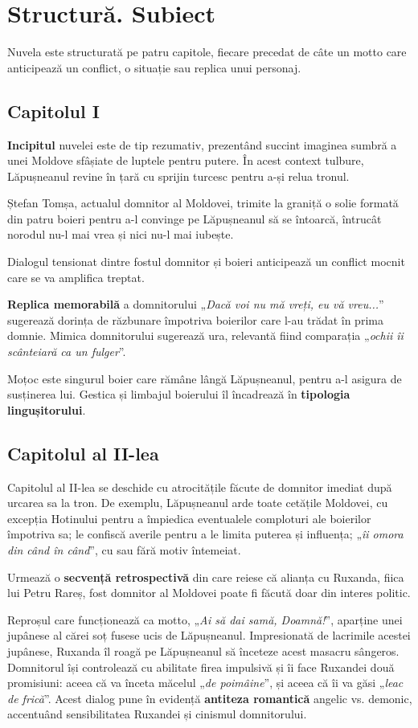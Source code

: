 \documentclass{article}
\newcommand{\qu}[1]{„\emph{#1}”}
\begin{document}
\section{Structură. Subiect}
Nuvela este structurată pe patru capitole, fiecare precedat de câte un motto care anticipează un conflict, o situație sau replica unui personaj.
\subsection{Capitolul I}
\textbf{Incipitul} nuvelei este de tip rezumativ, prezentând succint imaginea sumbră a unei Moldove sfâșiate de luptele pentru putere. În acest context tulbure, Lăpușneanul revine în țară cu sprijin turcesc pentru a-și relua tronul.

Ștefan Tomșa, actualul domnitor al Moldovei, trimite la graniță o solie formată din patru boieri pentru a-l convinge pe Lăpușneanul să se întoarcă, întrucât norodul nu-l mai vrea și nici nu-l mai iubește.

Dialogul tensionat dintre fostul domnitor și boieri anticipează un conflict mocnit care se va amplifica treptat.

\textbf{Replica memorabilă} a domnitorului \qu{Dacă voi nu mă vreți, eu vă vreu...} sugerează dorința de răzbunare împotriva boierilor care l-au trădat în prima domnie. Mimica domnitorului sugerează ura, relevantă fiind comparația \qu{ochii îi scânteiară ca un fulger}.

Moțoc este singurul boier care rămâne lângă Lăpușneanul, pentru a-l asigura de susținerea lui. Gestica și limbajul boierului îl încadrează în \textbf{tipologia lingușitorului}.

\subsection{Capitolul al II-lea}
Capitolul al II-lea se deschide cu atrocitățile făcute de domnitor imediat după urcarea sa la tron. De exemplu, Lăpușneanul arde toate cetățile Moldovei, cu excepția Hotinului pentru a împiedica eventualele comploturi ale boierilor împotriva sa; le confiscă averile pentru a le limita puterea și influența; \qu{îi omora din când în când}, cu sau fără motiv întemeiat.

Urmează o \textbf{secvență retrospectivă} din care reiese că alianța cu Ruxanda, fiica lui Petru Rareș, fost domnitor al Moldovei poate fi făcută doar din interes politic.

Reproșul care funcționează ca motto, \qu{Ai să dai samă, Doamnă!}, aparține unei jupânese al cărei soț fusese ucis de Lăpușneanul. Impresionată de lacrimile acestei jupânese, Ruxanda îl roagă pe Lăpușneanul să înceteze acest masacru sângeros. Domnitorul își controlează cu abilitate firea impulsivă și îi face Ruxandei două promisiuni: aceea că va înceta măcelul \qu{de poimâine}, și aceea că îi va găsi \qu{leac de frică}. Acest dialog pune în evidență \textbf{antiteza romantică} angelic vs. demonic, accentuând sensibilitatea Ruxandei și cinismul domnitorului.
\end{document}
